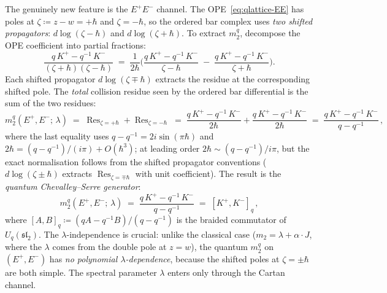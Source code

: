 \begin{conjecture}
The genuinely new feature is the $E^+E^-$ channel. The
OPE~\eqref{eq:qlattice-EE} has poles at
$\zeta \coloneqq z{-}w = +\hbar$ and $\zeta = -\hbar$, so
the ordered bar complex uses \emph{two shifted propagators}:
$d\log(\zeta - \hbar)$ and $d\log(\zeta + \hbar)$. To
extract $m_2^q$, decompose the OPE coefficient into
partial fractions:
\begin{equation}\label{eq:qlattice-partial-fraction}
\frac{q\,K^+ - q^{-1}\,K^-}{(\zeta+\hbar)(\zeta-\hbar)}
\;=\;
\frac{1}{2\hbar}\biggl(
\frac{q\,K^+ - q^{-1}\,K^-}{\zeta - \hbar}
\;-\;
\frac{q\,K^+ - q^{-1}\,K^-}{\zeta + \hbar}
\biggr).
\end{equation}
Each shifted propagator $d\log(\zeta \mp \hbar)$ extracts the
residue at the corresponding shifted pole. The \emph{total}
collision residue seen by the ordered bar differential is
the sum of the two residues:
\begin{equation}\label{eq:qlattice-m2}
m_2^q(E^+, E^-;\,\lambda)
\;=\;
\operatorname{Res}_{\zeta=+\hbar}
+\operatorname{Res}_{\zeta=-\hbar}
\;=\;
\frac{q\,K^+ - q^{-1}\,K^-}{2\hbar}
+
\frac{q\,K^+ - q^{-1}\,K^-}{2\hbar}
\;=\;
\frac{q\,K^+ - q^{-1}\,K^-}{q - q^{-1}}\,,
\end{equation}
where the last equality uses $q - q^{-1} = 2i\sin(\pi\hbar)$
and $2\hbar = (q - q^{-1})/(i\pi) + O(\hbar^3)$; at leading
order $2\hbar \sim (q-q^{-1})/i\pi$, but the exact
normalisation follows from the shifted propagator conventions
($d\log(\zeta \pm \hbar)$ extracts
$\operatorname{Res}_{\zeta = \mp\hbar}$ with unit coefficient).
The result is the \emph{quantum Chevalley--Serre generator}:
\begin{equation}\label{eq:qlattice-braided-commutator}
m_2^q(E^+,E^-;\,\lambda)
\;=\;
\frac{q\,K^+ - q^{-1}\,K^-}{q - q^{-1}}
\;=\;
[K^+, K^-]_q\,,
\end{equation}
where $[A,B]_q \coloneqq (qA - q^{-1}B)/(q-q^{-1})$
is the braided commutator of $U_q(\mathfrak{sl}_2)$.
The $\lambda$-independence is crucial: unlike the classical
case ($m_2 = \lambda + \alpha\cdot J$, where the $\lambda$
comes from the double pole at $z = w$), the quantum $m_2^q$
on $(E^+, E^-)$ has \emph{no polynomial $\lambda$-dependence},
because the shifted poles at $\zeta = \pm\hbar$ are both
simple. The spectral parameter $\lambda$ enters only through
the Cartan channel.


\end{conjecture}

